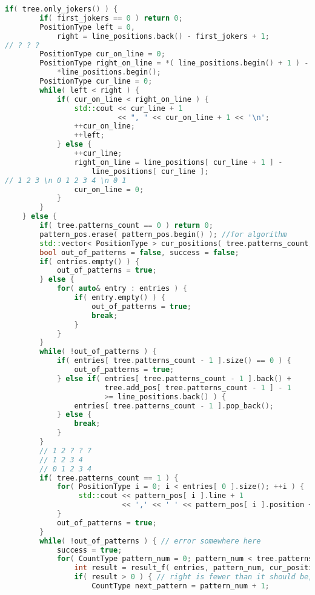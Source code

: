 \begin{lstlisting}[language=C++]
    if( tree.only_jokers() ) {
        if( first_jokers == 0 ) return 0;
        PositionType left = 0,
            right = line_positions.back() - first_jokers + 1;
// ? ? ?
        PositionType cur_on_line = 0;
        PositionType right_on_line = *( line_positions.begin() + 1 ) -
            *line_positions.begin();
        PositionType cur_line = 0;
        while( left < right ) {
            if( cur_on_line < right_on_line ) {
                std::cout << cur_line + 1
                          << ", " << cur_on_line + 1 << '\n';
                ++cur_on_line;
                ++left;
            } else {
                ++cur_line;
                right_on_line = line_positions[ cur_line + 1 ] -
                    line_positions[ cur_line ];
// 1 2 3 \n 0 1 2 3 4 \n 0 1
                cur_on_line = 0;
            }
        }
    } else {
        if( tree.patterns_count == 0 ) return 0;
        pattern_pos.erase( pattern_pos.begin() ); //for algorithm
        std::vector< PositionType > cur_positions( tree.patterns_count, 0 );
        bool out_of_patterns = false, success = false;
        if( entries.empty() ) {
            out_of_patterns = true;
        } else {
            for( auto& entry : entries ) {
                if( entry.empty() ) {
                    out_of_patterns = true;
                    break;
                }
            }
        }
        while( !out_of_patterns ) {
            if( entries[ tree.patterns_count - 1 ].size() == 0 ) {
                out_of_patterns = true;
            } else if( entries[ tree.patterns_count - 1 ].back() +
                       tree.add_pos[ tree.patterns_count - 1 ] - 1
                       >= line_positions.back() ) {
                entries[ tree.patterns_count - 1 ].pop_back();
            } else {
                break;
            }
        }
        // 1 2 ? ? ?
        // 1 2 3 4
        // 0 1 2 3 4
        if( tree.patterns_count == 1 ) {
            for( PositionType i = 0; i < entries[ 0 ].size(); ++i ) {
                 std::cout << pattern_pos[ i ].line + 1
                           << ',' << ' ' << pattern_pos[ i ].position + 1 << '\n';
            }
            out_of_patterns = true;
        }
        while( !out_of_patterns ) { // error somewhere here
            success = true;
            for( CountType pattern_num = 0; pattern_num < tree.patterns_count - 1; ) {
                int result = result_f( entries, pattern_num, cur_positions, tree );
                if( result > 0 ) { // right is fewer than it should be, I should shift right
                    CountType next_pattern = pattern_num + 1;

\end{lstlisting}
